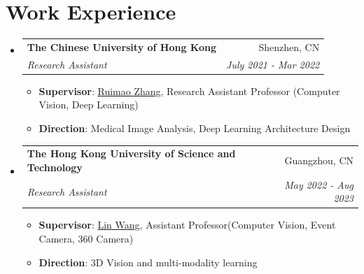 \documentclass[letterpaper,10.8pt]{article}
\makeatletter
\newcommand{\resumeItem}[2]{
  \item\small{
    \textbf{#1}{: #2 \vspace{-2pt}}
  }
}
\newcommand{\resumeSubheading}[4]{
  \vspace{-1pt}\item
    \begin{tabular*}{0.97\textwidth}{l@{\extracolsep{\fill}}r}
      \textbf{#1} & #2 \\
      \textit{\small#3} & \textit{\small #4} \\
    \end{tabular*}\vspace{-5pt}
}
\newcommand{\resumeSubHeadingListStart}{\begin{itemize}[leftmargin=*]}
\newcommand{\resumeSubHeadingListEnd}{\end{itemize}}
\newcommand{\resumeItemListStart}{\begin{itemize}}
\newcommand{\resumeItemListEnd}{\end{itemize}\vspace{-5pt}}
\makeatother
\begin{document}
\section{Work Experience}
  \resumeSubHeadingListStart
    \resumeSubheading
    {The Chinese University of Hong Kong}{Shenzhen, CN}
    {Research Assistant}{ July 2021 - Mar 2022}
    \resumeItemListStart
        \resumeItem{Supervisor}
        {\href{http://www.zhangruimao.site/}{Ruimao Zhang}, Research Assistant Professor (Computer Vision, Deep Learning)}
        \resumeItem{Direction}
        {Medical Image Analysis, Deep Learning Architecture Design}
    \resumeItemListEnd

    \resumeSubheading
    {The Hong Kong University of Science and Technology}{Guangzhou, CN}
    {Research Assistant}{May 2022 - Aug 2023}
    \resumeItemListStart
    \resumeItem{Supervisor}{\href{https://vlislab22.github.io/vlislab/people.html}{Lin Wang}, Assistant Professor(Computer Vision, Event Camera, 360 Camera)}
    \resumeItem{Direction}{3D Vision and multi-modality learning}
    \resumeItemListEnd
\resumeSubHeadingListEnd
\end{document}
